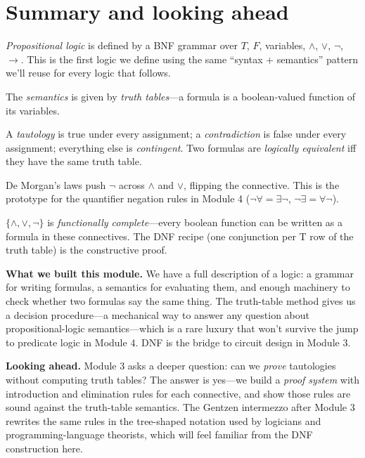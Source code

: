 \documentclass[11pt]{article}
\begin{document}
\section{Summary and looking ahead}

\begin{keytakeaway}
  \item \emph{Propositional logic} is defined by a BNF grammar over $T$, $F$, variables, $\wedge$, $\vee$, $\lnot$, $\to$. This is the first logic we define using the same ``syntax + semantics'' pattern we'll reuse for every logic that follows.
  \item The \emph{semantics} is given by \emph{truth tables}---a formula is a boolean-valued function of its variables.
  \item A \emph{tautology} is true under every assignment; a \emph{contradiction} is false under every assignment; everything else is \emph{contingent}. Two formulas are \emph{logically equivalent} iff they have the same truth table.
  \item De Morgan's laws push $\lnot$ across $\wedge$ and $\vee$, flipping the connective. This is the prototype for the quantifier negation rules in Module 4 ($\lnot\forall = \exists\lnot$, $\lnot\exists = \forall\lnot$).
  \item $\{\wedge, \vee, \lnot\}$ is \emph{functionally complete}---every boolean function can be written as a formula in these connectives. The DNF recipe (one conjunction per T row of the truth table) is the constructive proof.
\end{keytakeaway}

\begin{summarybox}
\textbf{What we built this module.} We have a full description of a logic: a grammar for writing formulas, a semantics for evaluating them, and enough machinery to check whether two formulas say the same thing. The truth-table method gives us a decision procedure---a mechanical way to answer any question about propositional-logic semantics---which is a rare luxury that won't survive the jump to predicate logic in Module 4. DNF is the bridge to circuit design in Module 3.

\medskip
\textbf{Looking ahead.} Module 3 asks a deeper question: can we \emph{prove} tautologies without computing truth tables? The answer is yes---we build a \emph{proof system} with introduction and elimination rules for each connective, and show those rules are sound against the truth-table semantics. The Gentzen intermezzo after Module 3 rewrites the same rules in the tree-shaped notation used by logicians and programming-language theorists, which will feel familiar from the DNF construction here.
\end{summarybox}
\end{document}
